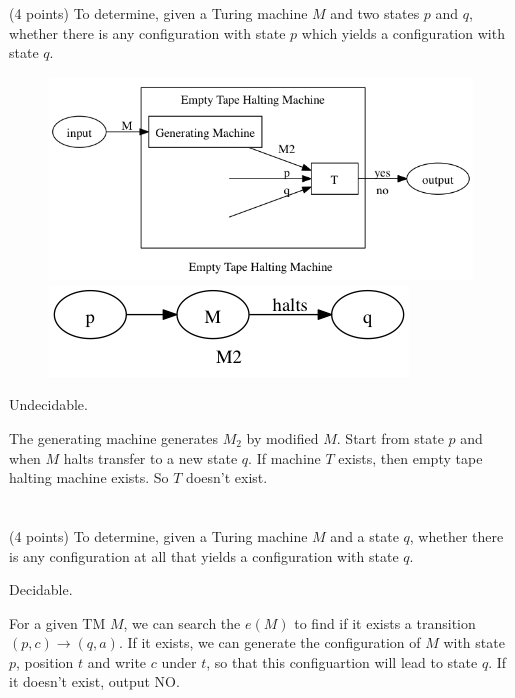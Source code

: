 \documentclass[paper=a4, fontsize=11pt]{scrartcl} %
\begin{document}
\section{}
\begin{fancyquotes}
  (4 points) To determine, given a Turing machine $M$ and two
  states $p$ and $q$, whether there is any configuration with state
  $p$ which yields a configuration with state $q$.
\end{fancyquotes}

\begin{figure}[H]
  \centering
  \includegraphics[width=\textwidth]{9-2.gv.png}
  \includegraphics[width=.5\textwidth]{9-2.gv.2.png}
\end{figure}

Undecidable.

The generating machine generates $M_2$ by modified $M$. Start from
state $p$ and when $M$ halts transfer to a new state $q$. If machine
$T$ exists, then empty tape halting machine exists. So $T$ doesn't
exist.


\section{}
\begin{fancyquotes}
  (4 points) To determine, given a Turing machine $M$ and a state
  $q$, whether there is any configuration at all that yields a
  configuration with state $q$.
\end{fancyquotes}

Decidable.

For a given TM $M$, we can search the $e(M)$ to find if it exists a
transition $(p,c)\rightarrow (q,a)$. If it exists, we can generate the
configuration of $M$ with state $p$, position $t$ and write $c$ under
$t$, so that this configuartion will lead to state $q$. If it doesn't
exist, output NO.
\end{document}
